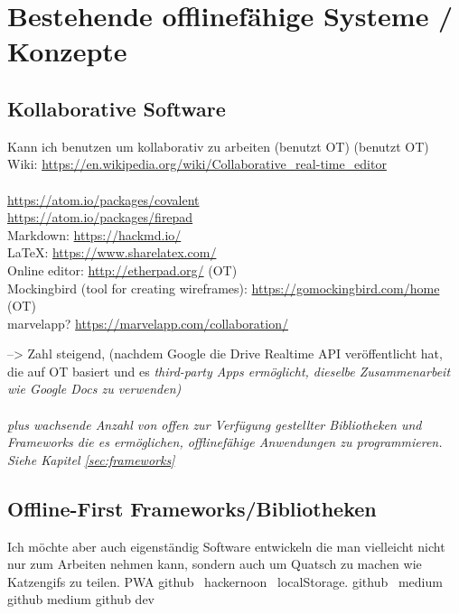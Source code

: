 \chapter{\label{chap:state}Bestehende offlinefähige Systeme / Konzepte}
%
%
\section{Kollaborative Software}
Kann ich benutzen um kollaborativ zu arbeiten
(benutzt OT)
(benutzt OT)
Wiki: \url{https://en.wikipedia.org/wiki/Collaborative_real-time_editor}\\\\
\url{https://atom.io/packages/covalent}\\
\url{https://atom.io/packages/firepad}\\
Markdown: \url{https://hackmd.io/}\\
LaTeX: \url{https://www.sharelatex.com/}\\
Online editor: \url{http://etherpad.org/} (OT)\\
Mockingbird (tool for creating wireframes): \url{https://gomockingbird.com/home} (OT)\\
marvelapp? \url{https://marvelapp.com/collaboration/}

--> Zahl steigend, (nachdem Google die Drive Realtime API veröffentlicht hat, die auf \gls{OT} basiert und es \it{third-party Apps} ermöglicht, dieselbe Zusammenarbeit wie Google Docs zu verwenden)\\\\
\b{plus} wachsende Anzahl von offen zur Verfügung gestellter Bibliotheken und Frameworks die es ermöglichen, offlinefähige Anwendungen zu programmieren. Siehe Kapitel \ref{sec:frameworks}
%
%
\section{\label{sec:frameworks}Offline-First Frameworks/Bibliotheken}
Ich möchte aber auch eigenständig Software entwickeln die man vielleicht nicht nur zum Arbeiten nehmen kann, sondern auch um Quatsch zu machen wie Katzengifs zu teilen.
\Gls{PWA}
%
%
\cite{realm}
%
%
github~\cite{redux-offline-gh}
hackernoon~\cite{redux-offline}
%
%
localStorage. github~\cite{redux-persist-gh} medium~\cite{redux-persist}
%
%
github \cite{rn-offline-gh} medium\cite{rn-offline-medium}
%
%
github\cite{webpack-gh}
dev\cite{webpack-dev}
%
%
\cite{hoodie}